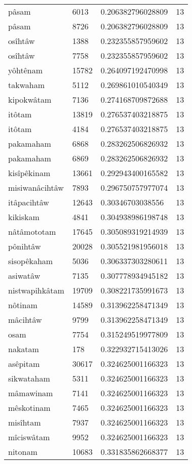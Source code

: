 \begin{longtable}{llll}
pâsam & 6013 & 0.206382796028809 & 13 \\
pâsam & 8726 & 0.206382796028809 & 13 \\
osîhtâw & 1388 & 0.232355857959602 & 13 \\
osîhtâw & 7758 & 0.232355857959602 & 13 \\
yôhtênam & 15782 & 0.264097192470998 & 13 \\
takwaham & 5112 & 0.269861010540349 & 13 \\
kipokwâtam & 7136 & 0.274168709872688 & 13 \\
itôtam & 13819 & 0.276537403218875 & 13 \\
itôtam & 4184 & 0.276537403218875 & 13 \\
pakamaham & 6868 & 0.283262506826932 & 13 \\
pakamaham & 6869 & 0.283262506826932 & 13 \\
kisîpêkinam & 13661 & 0.292943400165582 & 13 \\
misiwanâcihtâw & 7893 & 0.296750757977074 & 13 \\
itâpacihtâw & 12643 & 0.30346703038556 & 13 \\
kikiskam & 4841 & 0.304938986198748 & 13 \\
nâtâmototam & 17645 & 0.305089319214939 & 13 \\
pônihtâw & 20028 & 0.305521981956018 & 13 \\
sisopêkaham & 5036 & 0.306337303280611 & 13 \\
asiwatâw & 7135 & 0.307778934945182 & 13 \\
nistwapihkâtam & 19709 & 0.308221735991673 & 13 \\
nôtinam & 14589 & 0.313962258471349 & 13 \\
mâcihtâw & 9799 & 0.313962258471349 & 13 \\
osam & 7754 & 0.315249519977809 & 13 \\
nakatam & 178 & 0.322932715413026 & 13 \\
asêpitam & 30617 & 0.324625001166323 & 13 \\
sikwataham & 5311 & 0.324625001166323 & 13 \\
mâmawinam & 7141 & 0.324625001166323 & 13 \\
mêskotinam & 7465 & 0.324625001166323 & 13 \\
misîhtam & 7937 & 0.324625001166323 & 13 \\
mîciswâtam & 9952 & 0.324625001166323 & 13 \\
nitonam & 10683 & 0.331835862668377 & 13 \\

\end{longtable}
